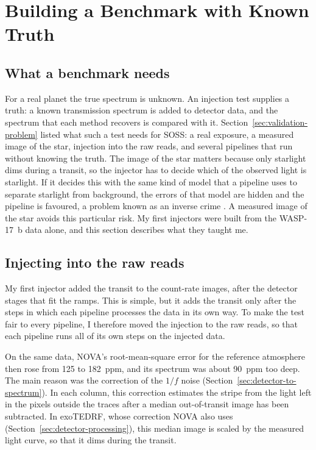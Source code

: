 \section{Building a Benchmark with Known Truth}
\label{sec:benchmark}

\subsection{What a benchmark needs}
\label{sec:benchmark-needs}

For a real planet the true spectrum is unknown. An injection test supplies a
truth: a known transmission spectrum is added to detector data, and the
spectrum that each method recovers is compared with it.
Section~\ref{sec:validation-problem} listed what such a test needs for SOSS: a
real exposure, a measured image of the star, injection into the raw reads,
and several pipelines that run without knowing the truth. The image of the star matters because only starlight dims during a
transit, so the injector has to decide which of the observed light is
starlight. If it decides this with the same kind of model that a pipeline uses
to separate starlight from background, the errors of that model are hidden and
the pipeline is favoured, a problem known as an inverse crime
\citep{KaipioSomersalo2007}. A measured image of the star avoids this
particular risk. My first
injectors were built from the WASP-17~b data alone, and this section describes
what they taught me.

\subsection{Injecting into the raw reads}
\label{sec:raw-injection}

My first injector added the transit to the count-rate images, after the
detector stages that fit the ramps. This is simple, but it adds the transit
only after the steps in which each pipeline processes the data in its own
way. To make the test fair to every pipeline, I therefore moved the injection
to the raw reads, so that each pipeline runs all of its own steps on the
injected data.

On the same data, NOVA's root-mean-square error for the reference atmosphere
then rose from 125 to 182~ppm, and its spectrum was about 90~ppm too deep. The main reason was the correction of the $1/f$ noise
(Section~\ref{sec:detector-to-spectrum}). In each column, this correction
estimates the stripe from the light left in the pixels outside the traces
after a median out-of-transit image has been subtracted. In exoTEDRF, whose
correction NOVA also uses (Section~\ref{sec:detector-processing}), this
median image is scaled by the measured light curve, so that it dims during the
transit.

